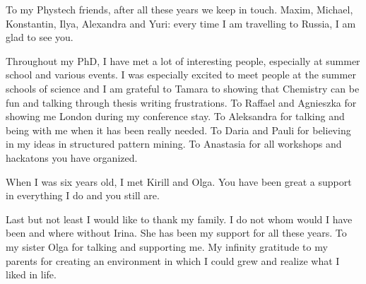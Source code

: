 To my Phystech friends, after all these years we keep in touch. Maxim, Michael, Konstantin, Ilya, Alexandra and Yuri: every time I am travelling to Russia, I am glad to see you.

Throughout my PhD, I have met a lot of interesting people, especially at summer school and various events. I was especially excited to meet people at the summer schools of science and I am grateful to Tamara to showing that Chemistry can be fun and talking through thesis writing frustrations. To Raffael and Agnieszka for showing me London during my conference stay. To Aleksandra for talking and being with me when it has been really needed. To Daria and Pauli for believing in my ideas in structured pattern mining. To Anastasia for all workshops and hackatons you have organized.

When I was six years old, I met Kirill and Olga. You have been great a support in everything I do and you still are.

Last but not least I would like to thank my family. I do not whom would I have been and where without Irina. She has been my support for all these years. To my sister Olga for talking and supporting me. My infinity gratitude to my parents for creating an environment in which I could grew and realize what I liked in life.

